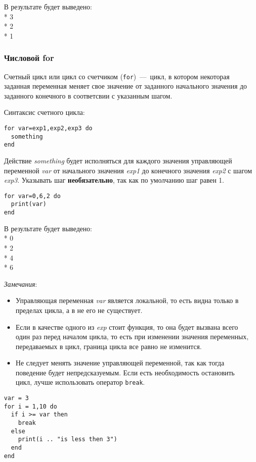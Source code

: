 В результате будет выведено:
\\* 3
\\* 2
\\* 1

\subsubsection{Числовой for}
Счетный цикл или цикл со счетчиком (\lstinline{for})~---~цикл, в котором некоторая заданная переменная меняет свое значение от заданного начального значения до заданного конечного в соответсвии с указанным шагом. 

Синтаксис счетного цикла: 
\begin{lstlisting}
for var=exp1,exp2,exp3 do
  something
end
\end{lstlisting}

Действие \emph{something} будет исполняться для каждого значения управляющей переменной \emph{var} от начального значения \emph{exp1} до конечного значения \emph{exp2} с шагом \emph{exp3}. Указывать шаг \textbf{необязательно}, так как по умолчанию шаг равен 1.

\begin{lstlisting}
for var=0,6,2 do
  print(var) 
end
\end{lstlisting}

В результате будет выведено:
\\* 0
\\* 2
\\* 4
\\* 6

\emph{Замечания}:
\begin{itemize}
	\item Управляющая переменная \emph{var} является локальной, то есть видна только в пределах цикла, а в не его не существует.
	\item Если в качестве одного из \emph{exp} стоит функция, то она будет вызвана всего один раз перед началом цикла, то есть при изменении значения переменных, передаваемых в цикл, граница цикла все равно не изменится. 
	\item Не следует менять значение управляющей переменной, так как тогда поведение будет непредсказуемым. Если есть необходимость остановить цикл, лучше использовать оператор \lstinline{break}.
\end{itemize}

		   
\begin{lstlisting}
var = 3
for i = 1,10 do
  if i >= var then
    break
  else
    print(i .. "is less then 3")
  end
end
\end{lstlisting}

